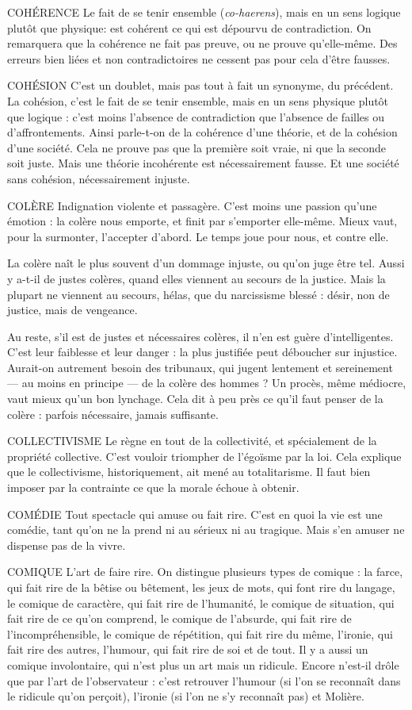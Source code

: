 COHÉRENCE Le fait de se tenir ensemble ({\it co-haerens}), mais en un sens
logique plutôt que physique: est cohérent ce qui est
dépourvu de contradiction. On remarquera que la cohérence ne fait pas preuve,
ou ne prouve qu’elle-même. Des erreurs bien liées et non contradictoires ne
cessent pas pour cela d’être fausses.

COHÉSION C'est un doublet, mais pas tout à fait un synonyme, du précédent.
La cohésion, c’est le fait de se tenir ensemble, mais en un
sens physique plutôt que logique : c’est moins l’absence de contradiction que
l'absence de failles ou d’affrontements. Ainsi parle-t-on de la cohérence d’une
théorie, et de la cohésion d’une société. Cela ne prouve pas que la première soit
vraie, ni que la seconde soit juste. Mais une théorie incohérente est nécessairement
fausse. Et une société sans cohésion, nécessairement injuste.

COLÈRE  Indignation violente et passagère. C’est moins une passion qu’une
émotion : la colère nous emporte, et finit par s’emporter elle-même.
Mieux vaut, pour la surmonter, l’accepter d’abord. Le temps joue pour
nous, et contre elle.

La colère naît le plus souvent d’un dommage injuste, ou qu’on juge être tel.
Aussi y a-t-il de justes colères, quand elles viennent au secours de la justice.
Mais la plupart ne viennent au secours, hélas, que du narcissisme blessé : désir,
non de justice, mais de vengeance.

Au reste, s’il est de justes et nécessaires colères, il n’en est guère d’intelligentes.
C’est leur faiblesse et leur danger : la plus justifiée peut déboucher
sur injustice. Aurait-on autrement besoin des tribunaux, qui jugent lentement
et sereinement — au moins en principe — de la colère des hommes ?
Un procès, même médiocre, vaut mieux qu’un bon lynchage. Cela dit à
peu près ce qu’il faut penser de la colère : parfois nécessaire, jamais suffisante.

COLLECTIVISME Le règne en tout de la collectivité, et spécialement de la
propriété collective. C’est vouloir triompher de l’égoïsme
par la loi. Cela explique que le collectivisme, historiquement, ait mené au totalitarisme.
Il faut bien imposer par la contrainte ce que la morale échoue à
obtenir.

COMÉDIE Tout spectacle qui amuse ou fait rire. C’est en quoi la vie est
une comédie, tant qu’on ne la prend ni au sérieux ni au tragique.
Mais s’en amuser ne dispense pas de la vivre.

COMIQUE L'art de faire rire. On distingue plusieurs types de comique : la
farce, qui fait rire de la bêtise ou bêtement, les jeux de mots,
qui font rire du langage, le comique de caractère, qui fait rire de l'humanité, le
comique de situation, qui fait rire de ce qu’on comprend, le comique de
l'absurde, qui fait rire de l’incompréhensible, le comique de répétition, qui fait
rire du même, l'ironie, qui fait rire des autres, l'humour, qui fait rire de soi et
de tout. Il y a aussi un comique involontaire, qui n’est plus un art mais un
ridicule. Encore n'est-il drôle que par l’art de l’observateur : c’est retrouver
l’humour (si l’on se reconnaît dans le ridicule qu’on perçoit), l'ironie (si l’on ne
s’y reconnaît pas) et Molière.


